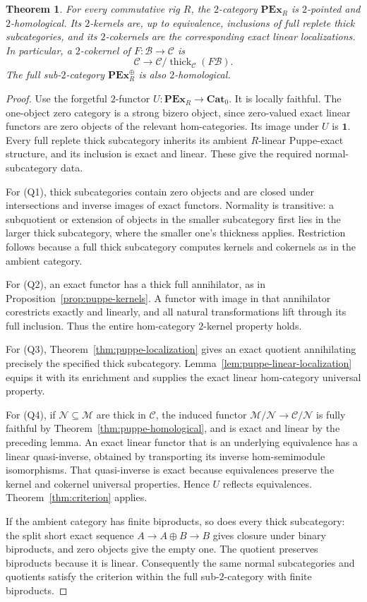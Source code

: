 \documentclass[11pt,reqno,a4paper]{amsart}
\newtheorem{theorem}{Theorem}[section]
\theoremstyle{definition}
\theoremstyle{remark}
\newcommand{\C}{\mathcal{C}}
\newcommand{\M}{\mathcal{M}}
\newcommand{\N}{\mathcal{N}}
\newcommand{\0}{\mathbf{0}}
\renewcommand{\1}{\mathbf{1}}
\newcommand{\Pt}{\mathbf{Cat}_{0}}
\newcommand{\B}{\mathcal B}
\DeclareMathOperator{\thick}{thick}
\begin{document}
\begin{theorem}\label{thm:puppe-linear}
For every commutative rig $R$, the $2$-category
$\mathbf{PEx}_{R}$ is $2$-pointed and $2$-homological.
Its $2$-kernels are, up to equivalence, inclusions of full
replete thick subcategories, and its $2$-cokernels are the
corresponding exact linear localizations. In particular, a
$2$-cokernel of $F:\B\to\C$ is
\[
 \C\longrightarrow\C/\thick_{\C}(F\B).
\]
The full sub-$2$-category $\mathbf{PEx}_{R}^{\oplus}$ is
also $2$-homological.
\end{theorem}
\begin{proof}
Use the forgetful $2$-functor
$U:\mathbf{PEx}_{R}\to\Pt$. It is locally faithful.
The one-object zero category is a strong bizero object, since
zero-valued exact linear functors are zero objects of the
relevant hom-categories. Its image under $U$ is $\mathbf1$.
Every full replete thick subcategory inherits its ambient
$R$-linear Puppe-exact structure, and its inclusion is exact
and linear. These give the required normal-subcategory data.

For (Q1), thick subcategories contain zero objects and are
closed under intersections and inverse images of exact
functors. Normality is transitive: a subquotient or extension
of objects in the smaller subcategory first lies in the
larger thick subcategory, where the smaller one's thickness
applies. Restriction follows because a full thick subcategory
computes kernels and cokernels as in the ambient category.

For (Q2), an exact functor has a thick full annihilator, as in
Proposition~\ref{prop:puppe-kernels}. A functor with image in
that annihilator corestricts exactly and linearly, and all
natural transformations lift through its full inclusion.
Thus the entire hom-category $2$-kernel property holds.

For (Q3), Theorem~\ref{thm:puppe-localization} gives an exact
quotient annihilating precisely the specified thick
subcategory. Lemma~\ref{lem:puppe-linear-localization} equips
it with its enrichment and supplies the exact linear
hom-category universal property.

For (Q4), if $\N\subseteq\M$ are thick in $\C$, the
induced functor $\M/\N\to\C/\N$ is fully faithful by
Theorem~\ref{thm:puppe-homological}, and is exact and linear
by the preceding lemma. An exact linear functor that is an
underlying equivalence has a linear quasi-inverse, obtained
by transporting its inverse hom-semimodule isomorphisms.
That quasi-inverse is exact because equivalences preserve
the kernel and cokernel universal properties. Hence $U$
reflects equivalences. Theorem~\ref{thm:criterion} applies.

If the ambient category has finite biproducts, so does every
thick subcategory: the split short exact sequence
$A\to A\oplus B\to B$ gives closure under binary
biproducts, and zero objects give the empty one. The quotient
preserves biproducts because it is linear. Consequently the
same normal subcategories and quotients satisfy the criterion
within the full sub-$2$-category with finite biproducts.
\end{proof}
\end{document}
